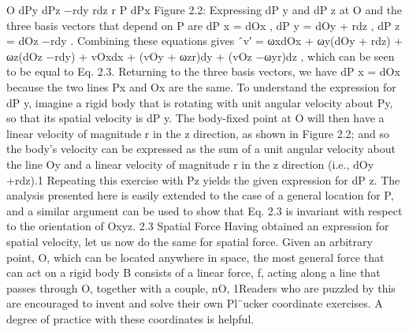 O dPy dPz −rdy rdz r P dPx Figure 2.2: Expressing dP y and dP z at O and the three basis vectors that depend on P are dP x = dOx , dP y = dOy + rdz , dP z = dOz −rdy . Combining these equations gives ˆv′ = ωxdOx + ωy(dOy + rdz) + ωz(dOz −rdy) + vOxdx + (vOy + ωzr)dy + (vOz −ωyr)dz , which can be seen to be equal to Eq. 2.3. Returning to the three basis vectors, we have dP x = dOx because the two lines Px and Ox are the same. To understand the expression for dP y, imagine a rigid body that is rotating with unit angular velocity about Py, so that its spatial velocity is dP y. The body-fixed point at O will then have a linear velocity of magnitude r in the z direction, as shown in Figure 2.2; and so the body’s velocity can be expressed as the sum of a unit angular velocity about the line Oy and a linear velocity of magnitude r in the z direction (i.e., dOy +rdz).1 Repeating this exercise with Pz yields the given expression for dP z. The analysis presented here is easily extended to the case of a general location for P, and a similar argument can be used to show that Eq. 2.3 is invariant with respect to the orientation of Oxyz. 2.3 Spatial Force Having obtained an expression for spatial velocity, let us now do the same for spatial force. Given an arbitrary point, O, which can be located anywhere in space, the most general force that can act on a rigid body B consists of a linear force, f, acting along a line that passes through O, together with a couple, nO, 1Readers who are puzzled by this are encouraged to invent and solve their own Pl¨ucker coordinate exercises. A degree of practice with these coordinates is helpful.

